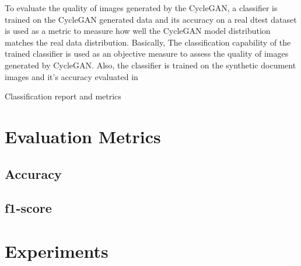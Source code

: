 \justifying
\setlength{\parskip}{1em}

To evaluate the quality of images generated by the \ac{CycleGAN}, a classifier is trained on the \ac{CycleGAN} generated data and its accuracy on a real dtest dataset is used as a metric to measure how well the \ac{CycleGAN} model distribution matches the real data distribution. Basically, The classification capability of the trained classifier is used as an objective measure to assess the quality of images generated by \ac{CycleGAN}.
Also, the classifier is trained on the synthetic document images and it's accuracy evaluated in 

Classification report and metrics



\section{Evaluation Metrics}



\subsection{Accuracy}


\subsection{f1-score}


\section{Experiments}\label{experiments}


